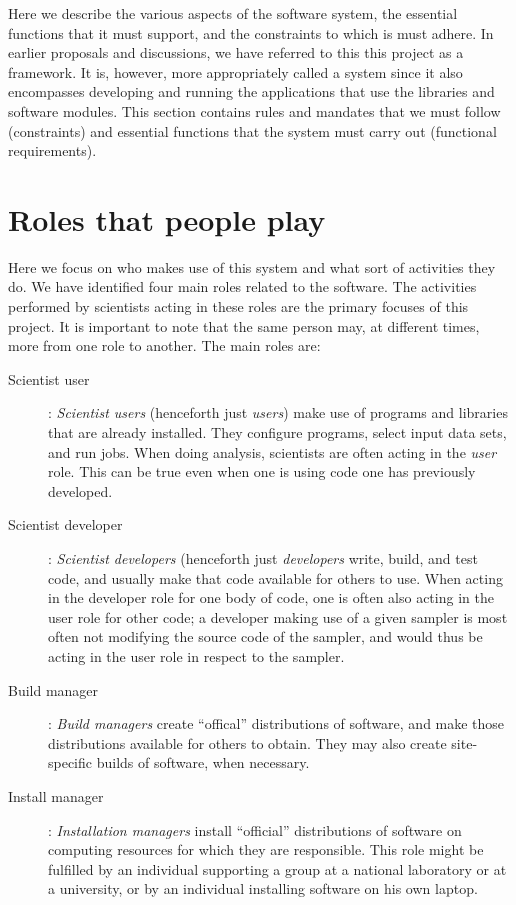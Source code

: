 \documentclass[draftmode,draftwater]{memarticle}
\newcommand{\cosmosis}{\name{CosmoSIS}\xspace}
\begin{document}
Here we describe the various aspects of the software
system, the essential functions that it must support, and the
constraints to which is must adhere. In earlier proposals and
discussions, we have referred to this this project as a framework. It
is, however, more appropriately called a system since it also encompasses
developing and running the applications that use the libraries and
software modules. This section contains rules and mandates that we
must follow (constraints) and essential functions that the system must
carry out (functional requirements).

\section{Roles that people play}

Here we focus on who makes use of this system and what sort of
activities they do. We have identified four main roles related to the
\cosmosis software. The activities performed by scientists acting in
these roles are the primary focuses of this project. It is important to
note that the same person may, at different times, more from one role to
another. The main roles are:
\begin{description}

\item[Scientist user]: \emph{Scientist users} (henceforth just
  \emph{users}) make use of programs and libraries that are already
  installed. They configure programs, select input data sets, and run
  jobs. When doing analysis, scientists are often acting in the
  \emph{user} role. This can be true even when one is using code one has
  previously developed.

\item[Scientist developer]: \emph{Scientist developers} (henceforth just
  \emph{developers} write, build, and test code, and usually make that
  code available for others to use. When acting in the developer role
  for one body of code, one is often also acting in the user role for
  other code; \eg a developer making use of a given sampler is most
  often not modifying the source code of the sampler, and would thus be
  acting in the user role in respect to the sampler.

\item[Build manager]: \emph{Build managers} create ``offical''
  distributions of software, and make those distributions available for
  others to obtain. They may also create site-specific builds of
  software, when necessary.

\item[Install manager]: \emph{Installation managers} install
  ``official'' distributions of software on computing resources for
  which they are responsible. This role might be fulfilled by an
  individual supporting a group at a national laboratory or at a
  university, or by an individual installing software on his own laptop.

\end{description}
\end{document}
